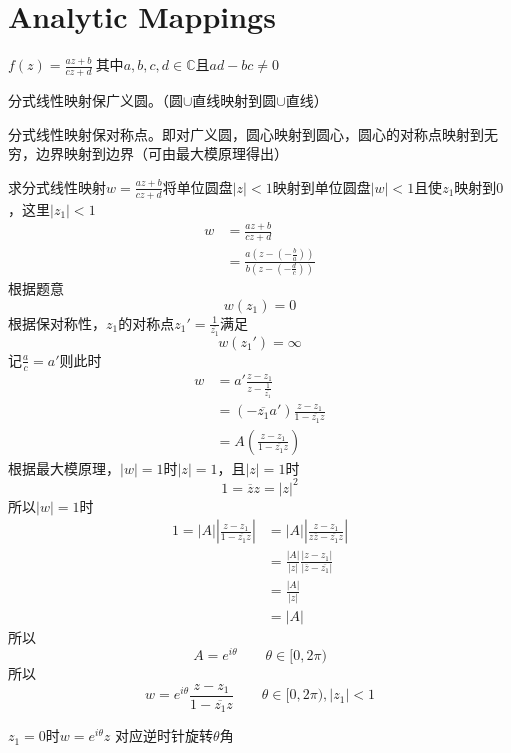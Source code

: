 \section{Analytic Mappings}
\begin{definition*}
    $f(z)=\frac{az+b}{cz+d}~$其中$a,b,c,d\in\mathbb{C}$且$ad-bc\neq0$
\end{definition*}
\begin{theorem*}
    分式线性映射保广义圆。（圆$\cup$直线映射到圆$\cup$直线）
\end{theorem*}
\begin{theorem*}
    分式线性映射保对称点。即对广义圆，圆心映射到圆心，圆心的对称点映射到无穷，边界映射到边界（可由最大模原理得出）
\end{theorem*}
\begin{homeworkProblem}
求分式线性映射$w=\frac{az+b}{cz+d}$将单位圆盘$|z|<1$映射到单位圆盘$|w|<1$且使$z_1$映射到$0$，这里$|z_1|<1$
\newline
\solution
\[\begin{split}
w &= \frac{az+b}{cz+d}\\
&= \frac{a(z-(-\frac{b}{a}))}{b(z-(-\frac{d}{c}))}
\end{split}\]
根据题意\[w(z_1)=0\]
根据保对称性，$z_1$的对称点$z_1'=\frac{1}{\overline{z_1}}$满足
\[w(z_1')=\infty\]
记$\frac{a}{c}=a'$则此时
\[
\begin{array}{ll}
w &= a'\frac{z-z_1}{z-\frac{1}{\overline{z_1}}} \\
&= (-\overline{z_1}a')\frac{z-z_1}{1-\overline{z_1}z} \\
&= A(\frac{z-z_1}{1-\overline{z_1}z})
\end{array}
\]
根据最大模原理，$|w|=1$时$|z|=1$，且$|z|=1$时
\[
1=\overline{z}z=|z|^2
\]
所以$|w|=1$时
\[
\begin{split}
    1 = |A|\left|\frac{z-z_1}{1-\overline{z_1}z}\right| &= |A|\left|\frac{z-z_1}{z\overline{z}-\overline{z_1}z}\right| \\
    &= \frac{|A|}{|z|}\frac{|z-z_1|}{|\overline{z}-\overline{z_1}|} \\
    &= \frac{|A|}{|z|}\\
    &= |A|
\end{split}
\]
所以
\[
A = e^{i\theta} \qquad \theta\in[0, 2\pi)
\]
所以
\[
 w = e^{i\theta}\frac{z-z_1}{1-\overline{z_1}z} \qquad \theta\in[0,2\pi),|z_1|<1
\]
\end{homeworkProblem}
\begin{corollary*}
 $z_1=0$时$w = e^{i\theta}z$ 对应逆时针旋转$\theta$角
\end{corollary*}
